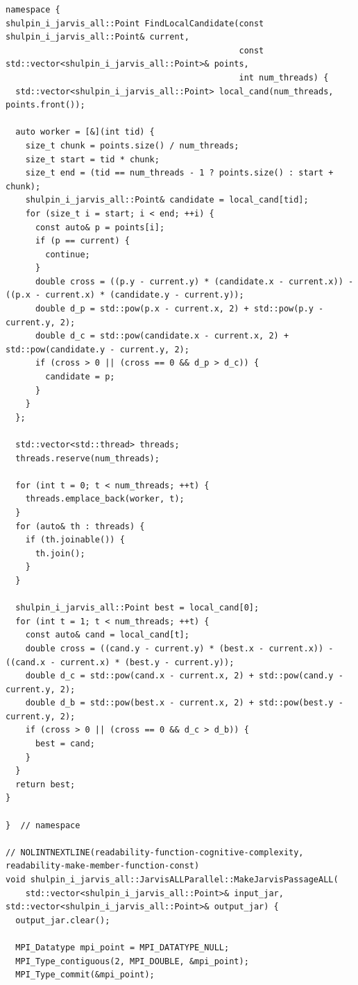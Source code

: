 \documentclass[12pt,a4paper]{article}
\begin{document}
\begin{lstlisting}[caption={Гибридная версия алгоритма(MPI+STL)}]
namespace {
shulpin_i_jarvis_all::Point FindLocalCandidate(const shulpin_i_jarvis_all::Point& current,
                                               const std::vector<shulpin_i_jarvis_all::Point>& points,
                                               int num_threads) {
  std::vector<shulpin_i_jarvis_all::Point> local_cand(num_threads, points.front());

  auto worker = [&](int tid) {
    size_t chunk = points.size() / num_threads;
    size_t start = tid * chunk;
    size_t end = (tid == num_threads - 1 ? points.size() : start + chunk);
    shulpin_i_jarvis_all::Point& candidate = local_cand[tid];
    for (size_t i = start; i < end; ++i) {
      const auto& p = points[i];
      if (p == current) {
        continue;
      }
      double cross = ((p.y - current.y) * (candidate.x - current.x)) - ((p.x - current.x) * (candidate.y - current.y));
      double d_p = std::pow(p.x - current.x, 2) + std::pow(p.y - current.y, 2);
      double d_c = std::pow(candidate.x - current.x, 2) + std::pow(candidate.y - current.y, 2);
      if (cross > 0 || (cross == 0 && d_p > d_c)) {
        candidate = p;
      }
    }
  };

  std::vector<std::thread> threads;
  threads.reserve(num_threads);

  for (int t = 0; t < num_threads; ++t) {
    threads.emplace_back(worker, t);
  }
  for (auto& th : threads) {
    if (th.joinable()) {
      th.join();
    }
  }

  shulpin_i_jarvis_all::Point best = local_cand[0];
  for (int t = 1; t < num_threads; ++t) {
    const auto& cand = local_cand[t];
    double cross = ((cand.y - current.y) * (best.x - current.x)) - ((cand.x - current.x) * (best.y - current.y));
    double d_c = std::pow(cand.x - current.x, 2) + std::pow(cand.y - current.y, 2);
    double d_b = std::pow(best.x - current.x, 2) + std::pow(best.y - current.y, 2);
    if (cross > 0 || (cross == 0 && d_c > d_b)) {
      best = cand;
    }
  }
  return best;
}

}  // namespace

// NOLINTNEXTLINE(readability-function-cognitive-complexity, readability-make-member-function-const)
void shulpin_i_jarvis_all::JarvisALLParallel::MakeJarvisPassageALL(
    std::vector<shulpin_i_jarvis_all::Point>& input_jar, std::vector<shulpin_i_jarvis_all::Point>& output_jar) {
  output_jar.clear();

  MPI_Datatype mpi_point = MPI_DATATYPE_NULL;
  MPI_Type_contiguous(2, MPI_DOUBLE, &mpi_point);
  MPI_Type_commit(&mpi_point);


\end{lstlisting}
\end{document}
